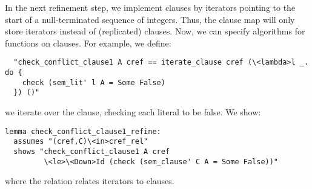 \documentclass[smallcondensed]{svjour3}     %
\makeatletter
\newcommand{\isai}{\lstinline[language=isabelle,basicstyle=\normalsize\ttfamily\slshape]}
\renewcommand\lstinline[1][]{%
  \leavevmode
  \ifmmode\expandafter\hbox\fi\bgroup
    \def\lst@boxpos{b}%
    \lsthk@PreSet\lstset{flexiblecolumns,#1}%
    \lsthk@TextStyle
    \@ifnextchar\bgroup{\afterassignment\lst@InlineG \let\@let@token}%
                       \lstinline@}
\makeatother
\begin{document}
In the next refinement step, we implement clauses by iterators pointing to the start of a null-terminated sequence of integers.
Thus, the clause map will only store iterators instead of (replicated) clauses. 
Now, we can specify algorithms for functions on clauses. For example, we define:
\begin{lstlisting}
  "check_conflict_clause1 A cref == iterate_clause cref (\<lambda>l _. do {
    check (sem_lit' l A = Some False)
  }) ()"
\end{lstlisting}
\ie we iterate over the clause, checking each literal to be false. We show:
\begin{lstlisting}
lemma check_conflict_clause1_refine: 
  assumes "(cref,C)\<in>cref_rel"
  shows "check_conflict_clause1 A cref 
         \<le>\<Down>Id (check (sem_clause' C A = Some False))"
\end{lstlisting}
where the relation \isai{cref_rel} relates iterators to clauses.
\end{document}
